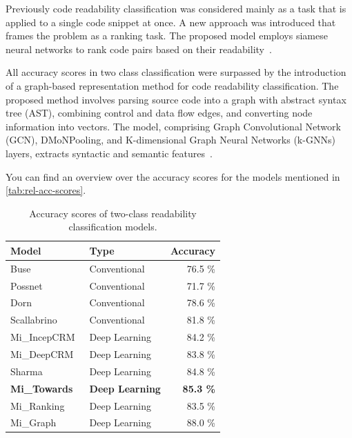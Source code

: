 \documentclass[%
class=scrreprt,
chapterprefix=false,%
open=right,%
twoside=false,%
paper=a4,%
logofile={Logo\_zentral\_farbig\_EN.png},%
thesistype=master,%
UKenglish,%
]{se2thesis}
\theoremstyle{definition}
\begin{document}
	Previously code readability classification was considered mainly as a task that is applied to a single code snippet at once. A new approach was introduced that frames the problem as a ranking task. The proposed model employs siamese neural networks to rank code pairs based on their readability~\cite{mi2022rank}.

	All accuracy scores in two class classification were surpassed by the introduction of a graph-based representation method for code readability classification. The proposed method involves parsing source code into a graph with abstract syntax tree (AST), combining control and data flow edges, and converting node information into vectors. The model, comprising Graph Convolutional Network (GCN), DMoNPooling, and K-dimensional Graph Neural Networks (k-GNNs) layers, extracts syntactic and semantic features~\cite{mi2023graph}.

	You can find an overview over the accuracy scores for the models mentioned in \autoref{tab:rel-acc-scores}.
	\begin{table}[tb]
		\centering
		\caption{Accuracy scores of two-class readability classification models.}
		\vspace{8pt}
		\label{tab:rel-acc-scores}
		\begin{tabular}{llr}
			\toprule
			Model & Type & Accuracy \\
			\midrule
			Buse~\cite{buse2009learning} & Conventional & 76.5 \% \\
			Possnet~\cite{posnett2011simpler} & Conventional & 71.7 \% \\
			Dorn~\cite{dorn2012general} & Conventional & 78.6 \% \\
			Scallabrino~\cite{scalabrino2018comprehensive} & Conventional & 81.8 \% \\
			Mi\_IncepCRM~\cite{mi2018inception} & Deep Learning & 84.2 \% \\
			Mi\_DeepCRM~\cite{mi2018improving} & Deep Learning & 83.8 \% \\
			Sharma~\cite{sharma2020egan} & Deep Learning & 84.8 \% \\
			\textbf{Mi\_Towards~\cite{mi2022towards}} & \textbf{Deep Learning} & \textbf{85.3 \%} \\
			Mi\_Ranking~\cite{mi2022rank} & Deep Learning & 83.5 \% \\
			Mi\_Graph~\cite{mi2023graph} & Deep Learning & 88.0 \% \\
			\bottomrule
		\end{tabular}
	\end{table}
	
\end{document}
